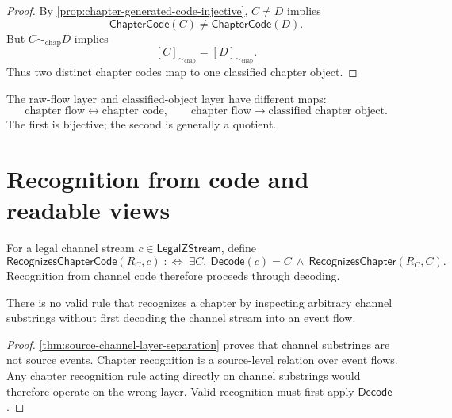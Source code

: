 \begin{proof}
By \autoref{prop:chapter-generated-code-injective}, $C\neq D$ implies
$$
  \mathsf{ChapterCode}(C)\neq\mathsf{ChapterCode}(D).
$$
But $C\sim_{\mathrm{chap}}D$ implies
$$
  [C]_{\sim_{\mathrm{chap}}}=[D]_{\sim_{\mathrm{chap}}}.
$$
Thus two distinct chapter codes map to one classified chapter object.
\end{proof}

\begin{corollary}
\label{cor:chapter-generated-flow-object-layer-differ}
The raw-flow layer and classified-object layer have different maps:
$$
  \text{chapter flow}
  \leftrightarrow
  \text{chapter code},
  \qquad
  \text{chapter flow}
  \longrightarrow
  \text{classified chapter object}.
$$
The first is bijective; the second is generally a quotient.
\end{corollary}

\section{Recognition from code and readable views}
\label{sec:chapter-generated-code-and-views}

\begin{definition}
\label{def:chapter-generated-recognition-from-code}
For a legal channel stream $c\in\mathsf{LegalZStream}$, define
$$
  \mathsf{RecognizesChapterCode}(R_C,c)
  \;:\Longleftrightarrow\;
  \exists C,\ \mathsf{Decode}(c)=C\ \wedge\ \mathsf{RecognizesChapter}(R_C,C).
$$
Recognition from channel code therefore proceeds through decoding.
\end{definition}

\begin{proposition}
\label{prop:chapter-generated-no-channel-substring-recognition}
There is no valid rule that recognizes a chapter by inspecting arbitrary channel substrings without first decoding the channel stream into an event flow.
\end{proposition}

\begin{proof}
\autoref{thm:source-channel-layer-separation} proves that channel substrings are not source events. Chapter recognition is a source-level relation over event flows. Any chapter recognition rule acting directly on channel substrings would therefore operate on the wrong layer. Valid recognition must first apply $\mathsf{Decode}$.
\end{proof}

